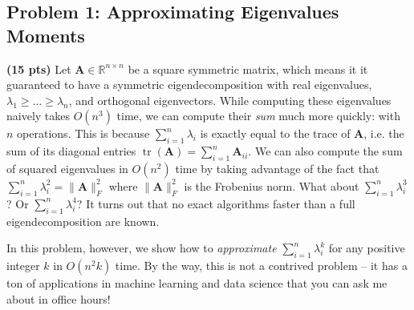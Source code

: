 \documentclass[10pt]{article}
\newcommand{\bv}[1]{\mathbf{#1}}
\newcommand{\R}{\mathbb{R}}
\DeclareMathOperator*{\argmin}{arg\,min}
\DeclareMathOperator{\tr}{tr}
\begin{document}

\subsection{Problem 1: Approximating Eigenvalues Moments} 
\textbf{(15 pts)}
Let $\bv{A}\in \R^{n\times n}$ be a square symmetric matrix, which means it it guaranteed to have a symmetric eigendecomposition with real eigenvalues, $\lambda_1 \geq \ldots \geq \lambda_n$, and orthogonal eigenvectors. While computing these eigenvalues naively takes $O(n^3)$ time, we can compute their \emph{sum} much more quickly: with $n$ operations. This is because $\sum_{i=1}^n\lambda_i$ is exactly equal to the trace of $\bv{A}$, i.e. the sum of its diagonal entries $\tr(\bv{A}) = \sum_{i=1}^n \bv{A}_{ii}$. We can also compute the sum of squared eigenvalues in $O(n^2)$ time by taking advantage of the fact that $\sum_{i=1}^n\lambda_i^2 = \|\bv{A}\|_F^2$ where $\|\bv{A}\|_F^2$ is the Frobenius norm. What about $\sum_{i=1}^n\lambda_i^3$? Or $\sum_{i=1}^n\lambda_i^4$? It turns out that no exact algorithms faster than a full eigendecomposition are known. 

In this problem, however, we show how to \emph{approximate} $\sum_{i=1}^n\lambda_i^k$ for any positive integer $k$ in $O(n^2k)$ time. By the way, this is not a contrived problem -- it has a ton of applications in machine learning and data science that you can ask me about in office hours!
\end{document}
